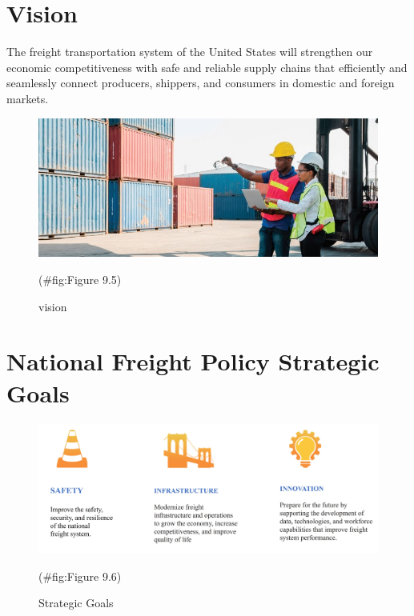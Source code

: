 \documentclass[
]{book}
\begin{document}
\hypertarget{planning-vision}{%
\section{Vision}\label{planning-vision}}

The freight transportation system of the United States will strengthen our economic competitiveness with safe and reliable supply chains that efficiently and seamlessly connect producers, shippers, and consumers in domestic and foreign markets.

\begin{figure}

{\centering \includegraphics{./Images/planning design/vision} 

}

\caption{vision}(\#fig:Figure 9.5)
\end{figure}

\hypertarget{planning-policy}{%
\section{National Freight Policy Strategic Goals}\label{planning-policy}}

\begin{figure}

{\centering \includegraphics{./Images/planning design/Strategic Goals} 

}

\caption{Strategic Goals}(\#fig:Figure 9.6)
\end{figure}
\end{document}
